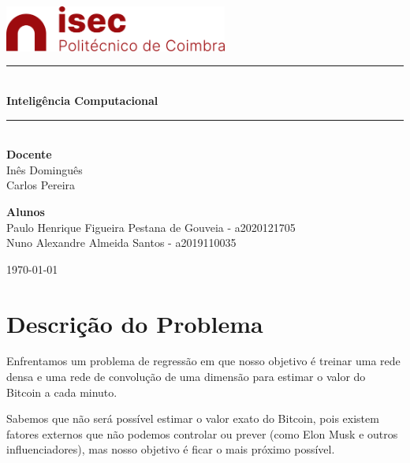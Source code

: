 \documentclass[10pt]{article}
\newcommand{\HRule}{\rule{\linewidth}{0.5mm}}
\begin{document}
\begin{titlepage}
\begin{center}

\includegraphics[width=0.55\textwidth]{img/logo-isec-transparente.png}~\\[2cm]


\HRule \\[0.4cm]
{ \LARGE 
  \textbf{Inteligência Computacional}\\[0.4cm]
}
\HRule \\[1.5cm]

{ \large
  \textbf{Docente} \\[0.1cm]
  Inês Dominguês \\ Carlos Pereira \\[2.5cm]
}


{ \large
  \textbf{Alunos} \\[0.1cm]
  Paulo Henrique Figueira Pestana de Gouveia - a2020121705 \\[0.1cm]
  Nuno Alexandre Almeida Santos - a2019110035\\[0.1cm]
}

\vfill



{\large \today}
 
\end{center}
\end{titlepage}


\newpage



\tableofcontents
{}
\newpage
\setcounter{page}{1}

\large
\section{Descrição do Problema}\label{sec:intro}
Enfrentamos um problema de regressão em que nosso objetivo é treinar 
uma rede densa e uma rede de convolução de uma dimensão 
para estimar o valor do Bitcoin a cada minuto. 

Sabemos que não será possível estimar o valor exato do Bitcoin, 
pois existem fatores externos que não podemos controlar ou prever 
(como Elon Musk e outros influenciadores), mas nosso objetivo é ficar 
o mais próximo possível. 
\end{document}
